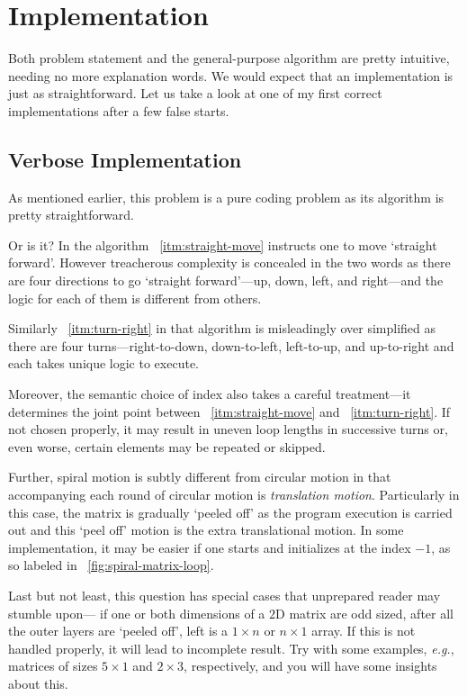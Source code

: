 \section{Implementation}\label{sec:spiral-matrix-implementation}

Both problem statement and the general-purpose algorithm are pretty intuitive, needing no more
explanation words.
We would expect that an implementation is just as straightforward.
Let us take a look at one of my first correct implementations after a few false starts.

\subsection{Verbose Implementation}\label{subsec:verboseImplementation}

As mentioned earlier, this problem is a pure coding problem as its algorithm is pretty
straightforward.

Or is it?
In the algorithm ~\ref{itm:straight-move} instructs one to move `straight forward'.
However treacherous complexity is concealed in the two words as there are four directions
to go `straight forward'---up, down, left, and right---and the logic for each of them is different
from others.

Similarly ~\ref{itm:turn-right} in that algorithm is misleadingly over simplified as there
are four turns---right-to-down, down-to-left, left-to-up, and up-to-right and each
takes unique logic to execute.

Moreover, the semantic choice of index also takes a careful treatment---it determines
the joint point between ~\ref{itm:straight-move} and ~\ref{itm:turn-right}.
If not chosen properly, it may result in uneven loop lengths in successive turns or, even worse,
certain elements may be repeated or skipped.

Further, spiral motion is subtly different from circular motion in that accompanying each round of
circular motion is \emph{translation motion}.
Particularly in this case, the matrix is gradually `peeled off' as the program execution is
carried out and this `peel off' motion is the extra translational motion.
In some implementation, it may be easier if one starts and initializes at the index $-1$,
as so labeled in ~\autoref{fig:spiral-matrix-loop}.

Last but not least, this question has special cases that unprepared reader may
stumble upon---\label{complication-special-case}
if one or both dimensions of a $2$D matrix are odd sized, after all the outer layers are `peeled
off', left is a $1\times n$ or $n \times 1$ array.
If this is not handled properly, it will lead to incomplete result.
Try with some examples, \textit{e.g.}, matrices of sizes $5 \times 1$ and $2\times 3$,
respectively, and you will have some insights about this.

